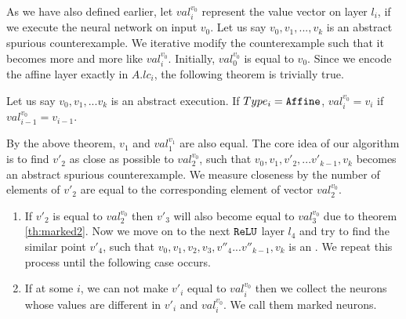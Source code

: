 As we have also defined earlier, let ${val_i^{{v_0}}}$ represent the value vector
on layer $l_i$, if we execute the neural network on input ${v_0}$.
%
Let us say ${v_0}, {v_1}, ... ,{v_k}$ is an abstract spurious counterexample.
We iterative modify the counterexample such that it becomes more and more
like ${val_i^{{v_0}}}$.
Initially, ${val_0^{{v_0}}}$ is equal to $v_0$.
Since we encode the affine layer exactly in $A.lc_i$, the following
theorem is trivially true.


\begin{theorem}
  \label{th:marked2}
  Let us say ${v_0}, {v_1}, ... {v_k}$ is an abstract execution. 
  If $Type_i = \texttt{Affine}$, ${val_i^{{v_0}}} = {v_i}$ if ${val_{i-1}^{{v_0}}} = {v_{i-1}}$.  
\end{theorem}

By the above theorem, ${v_1}$ and ${val_1^{v_1}}$ are also equal. 
The core idea of our algorithm is to find ${v'_2}$ as close as possible to ${val_2^{v_0}}$, 
such that ${v_0}, {v_1}, {v'_2}, ... {v'_{k-1}}, {v_k}$ becomes an abstract spurious counterexample. 
We measure closeness by the number of elements of ${v'_2}$ are equal to the 
corresponding element of vector ${val_2^{v_0}}$.
\begin{enumerate}
\item If ${v'_2}$ is equal to ${val_2^{v_0}}$ then ${v'_3}$ will also become 
  equal to ${val_3^{v_0}}$ due to theorem \ref{th:marked2}. 
  Now we move on to the next $\texttt{ReLU}${} layer $l_4$ and try to find the similar point ${v'_4}$, such that 
  ${v_0}, {v_1}, {v_2}, {v_3},{v''_4}... {v''_{k-1}},{v_k}$ is an . 
  We repeat this process until the following case occurs. 
\item If at some $i$, we can not make ${v'_i}$ equal to ${val_i^{v_0}}$ then we collect the neurons
  whose values are different in ${v'_i}$ and ${val_i^{v_0}}$. We call them marked neurons.
\end{enumerate}

